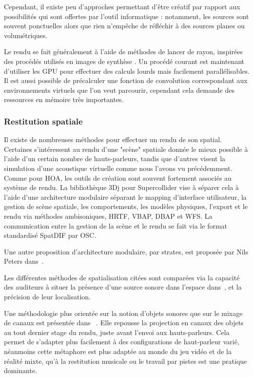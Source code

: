 \documentclass[french,12pt]{article}
\begin{document}
Cependant, il existe peu d'approches permettant d'être créatif par rapport aux possibilités qui sont offertes par l'outil informatique : notamment, les sources sont souvent ponctuelles alors que rien n'empêche de réfléchir à des sources planes ou volumétriques. 

Le rendu se fait généralement à l'aide de méthodes de lancer de rayon, inspirées des procédés utilisés en images de synthèse \cite{funkhouser_beam_1998,tsingos_fast_1998}.
Un procédé courant est maintenant d'utiliser les \ac{GPU} pour effectuer des calculs lourds mais facilement parallélisables\cite{rodriguez_performance_2014,cheng_design_2014,taylor_guided_2012}. Il est aussi possible de précalculer une fonction de convolution correspondant aux environnements virtuels que l'on veut parcourir, cependant cela demande des ressources en mémoire très importantes\cite{raghuvanshi_parametric_2014}.

\subsubsection{Restitution spatiale}
Il existe de nombreuses méthodes pour effectuer un rendu de son spatial. Certaines s'intéressent au rendu d'une "scène" spatiale donnée le mieux possible à l'aide d'un certain nombre de hauts-parleurs, tandis que d'autres visent la simulation d'une acoustique virtuelle comme nous l'avons vu précédemment. Comme pour HOA, les outils de création sont souvent fortement associés au système de rendu. La bibliothèque 3Dj\cite{perez-lopez_3dj_2015} pour Supercollider vise à séparer cela à l'aide d'une architecture modulaire séparant le mapping d'interface utilisateur, la gestion de scène spatiale, les comportements, les modèles physiques, l'export et le rendu via méthodes ambisoniques, HRTF\cite{noisternig_3d_2003}, \ac{VBAP}, \ac{DBAP} et \ac{WFS}.
La communication entre la gestion de la scène et le rendu se fait via le format standardisé SpatDIF\cite{peters_spatial_2013} par OSC. 

Une autre proposition d'architecture modulaire, par strates, est proposée par Nils Peters dans~\cite{peters_stratified_2009}.

Les différentes méthodes de spatialisation citées sont comparées via la capacité des auditeurs à situer la présence d'une source sonore dans l'espace dans~\cite{bates_comparative_2007}, et la précision de leur localisation.

Une méthodologie plus orientée sur la notion d'objets sonores que sur le mixage de canaux est présentée dans ~\cite{kondoz_object-based_2014}. Elle repousse la projection en canaux des objets au tout dernier stage du rendu, juste avant l'envoi aux hauts-parleurs. Cela permet de s'adapter plus facilement à des configurations de haut-parleur varié, néanmoins cette métaphore est plus adaptée au monde du jeu vidéo et de la réalité mixte, qu'à la restitution musicale ou le travail par pistes est une pratique dominante.  
\end{document}
